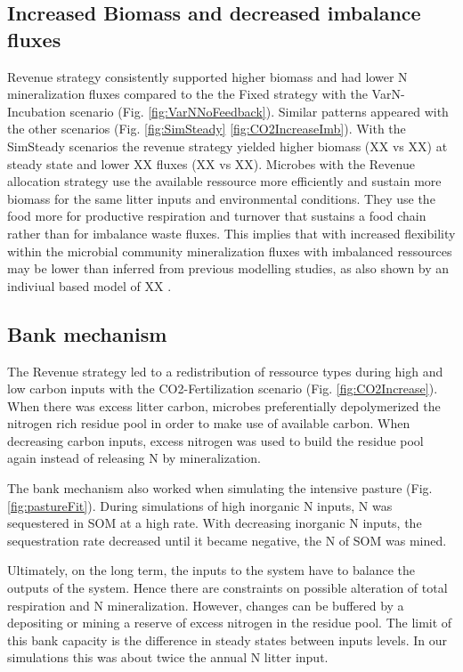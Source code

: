 \subsection{Increased Biomass and decreased imbalance fluxes}
Revenue strategy consistently supported higher biomass and had lower N
mineralization fluxes compared to the the Fixed strategy with the
VarN-Incubation scenario (Fig. \ref{fig:VarNNoFeedback}). Similar patterns
appeared with the other scenarios (Fig. \ref{fig:SimSteady}
\ref{fig:CO2IncreaseImb}). With the SimSteady scenarios the revenue strategy
yielded higher biomass (XX vs XX) at steady state and lower XX fluxes (XX vs
XX).
Microbes with the Revenue allocation strategy use the available ressource more
efficiently and sustain more biomass for the same litter inputs and
environmental conditions. They use the food more for productive respiration and
turnover that sustains a food chain rather than for imbalance waste fluxes. 
This implies that with increased flexibility within the microbial
community mineralization fluxes with imbalanced ressources may be lower than
inferred from previous modelling studies, as also shown by an indiviual based
model of XX \citep{Kaiser14}.
  

\subsection{Bank mechanism}
The Revenue strategy led to a redistribution of ressource types during high
and low carbon inputs with the  CO2-Fertilization scenario (Fig.
\ref{fig:CO2Increase}). When there was excess litter carbon, microbes
preferentially depolymerized the nitrogen rich residue pool in order to make use of available
carbon. When decreasing carbon inputs, excess nitrogen was used to
build the residue pool again instead of releasing N by mineralization.

The bank mechanism also worked when simulating the intensive
pasture (Fig. \ref{fig:pastureFit}). During simulations of high inorganic
N inputs, N was sequestered in SOM at a high rate. With decreasing inorganic N
inputs, the sequestration rate decreased until it became negative, the N of SOM
was mined.
 
Ultimately, on the long term, the inputs to the system have to balance the
outputs of the system. Hence there are constraints on possible alteration of
total respiration and N mineralization. However, changes can be buffered by a 
depositing or mining a reserve of excess nitrogen in the residue pool.
The limit of this bank capacity is the difference in steady states between
inputs levels. In our simulations this was about twice the annual N
litter input. 

